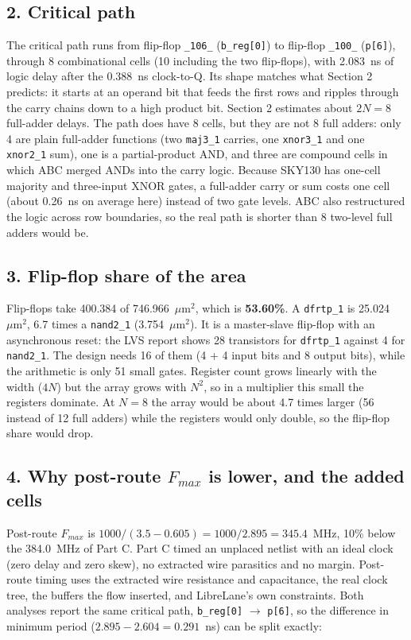 \documentclass[11pt,a4paper]{article}
\newcommand{\cell}[1]{\texttt{#1}}
\newcommand{\umsq}{\ensuremath{\mu\mathrm{m}^2}}
\begin{document}
\subsection*{2. Critical path}

The critical path runs from flip-flop \texttt{\_106\_} (\texttt{b\_reg[0]}) to
flip-flop \texttt{\_100\_} (\texttt{p[6]}), through 8 combinational cells (10
including the two flip-flops), with 2.083~ns of logic delay after the 0.388~ns
clock-to-Q. Its shape matches what Section 2 predicts: it starts at an operand
bit that feeds the first rows and ripples through the carry chains down to a high
product bit. Section 2 estimates about $2N = 8$ full-adder delays. The path does
have 8 cells, but they are not 8 full adders: only 4 are plain full-adder
functions (two \cell{maj3\_1} carries, one \cell{xnor3\_1} and one \cell{xnor2\_1}
sum), one is a partial-product AND, and three are compound cells in which ABC
merged ANDs into the carry logic. Because SKY130 has one-cell majority and
three-input XNOR gates, a full-adder carry or sum costs one cell (about 0.26~ns on
average here) instead of two gate levels. ABC also restructured the logic across
row boundaries, so the real path is shorter than 8 two-level full adders would be.

\subsection*{3. Flip-flop share of the area}

Flip-flops take 400.384 of 746.966~\umsq, which is \textbf{53.60\%}. A
\cell{dfrtp\_1} is 25.024~\umsq, 6.7 times a \cell{nand2\_1} (3.754~\umsq). It is a
master-slave flip-flop with an asynchronous reset: the LVS report shows 28
transistors for \cell{dfrtp\_1} against 4 for \cell{nand2\_1}. The design needs 16
of them (4 + 4 input bits and 8 output bits), while the arithmetic is only 51 small
gates. Register count grows linearly with the width ($4N$) but the array grows
with $N^2$, so in a multiplier this small the registers dominate. At $N = 8$ the
array would be about 4.7 times larger (56 instead of 12 full adders) while the
registers would only double, so the flip-flop share would drop.

\subsection*{4. Why post-route $F_{max}$ is lower, and the added cells}

Post-route $F_{max}$ is $1000 / (3.5 - 0.605) = 1000 / 2.895 = 345.4$~MHz, 10\%
below the 384.0~MHz of Part C. Part C timed an unplaced netlist with an ideal clock
(zero delay and zero skew), no extracted wire parasitics and no margin. Post-route timing uses
the extracted wire resistance and capacitance, the real clock tree, the buffers the
flow inserted, and LibreLane's own constraints. Both analyses report the same
critical path, \texttt{b\_reg[0]} $\rightarrow$ \texttt{p[6]}, so the difference
in minimum period ($2.895 - 2.604 = 0.291$~ns) can be split exactly:
\end{document}
